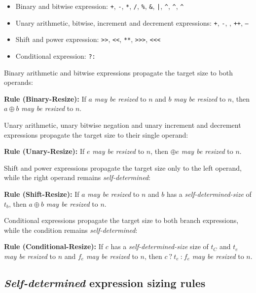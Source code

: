 \documentclass{article}
\newcommand{\tild}{\raisebox{-.7ex}{\textasciitilde{}}}
\newcommand{\sds}{\emph{self-determined-size}}
\newcommand{\mbr}{\emph{may be resized}}
\newenvironment{typingrule}[1]%
{\par\noindent\textbf{Rule (#1):} }%
{\par}
\begin{document}
\begin{itemize}
  \item Binary and bitwise expression:  \texttt{+}, \texttt{-}, \texttt{*},
    \texttt{/}, \texttt{\%}, \texttt{\&}, \texttt{|}, \texttt{\^{}},
    \texttt{\^{}\tild}, \texttt{\tild\^{}}
  \item Unary arithmetic, bitwise, increment and decrement expressions:
    \texttt{+}, \texttt{-}, \texttt{\tild}, \texttt{++}, \texttt{--}
  \item Shift and power expression: \texttt{>>}, \texttt{<}\texttt{<},
    \texttt{**}, \texttt{>>>}, \texttt{<}\texttt{<}\texttt{<}
  \item Conditional expression: \texttt{?:}

\end{itemize}

Binary arithmetic and bitwise expressions propagate the target size to both
operands:

\begin{typingrule}{Binary-Resize}
  If $a$ \mbr{} to $n$ and $b$ \mbr{} to $n$, then $a \oplus b$ \mbr{} to $n$.
\end{typingrule}

Unary arithmetic, unary bitwise negation and unary increment and decrement
expressions propagate the target size to their single operand:

\begin{typingrule}{Unary-Resize}
  If $e$ \mbr{} to $n$, then $\oplus e$ \mbr{} to $n$.
\end{typingrule}

Shift and power expressions propagate the target size only to the left operand,
while the right operand remains \emph{self-determined}:

\begin{typingrule}{Shift-Resize}
  If $a$ \mbr{} to $n$ and $b$ has a \sds{} of $t_{b}$, then
  $a \oplus b$ \mbr{} to $n$.
\end{typingrule}

Conditional expressions propagate the target size to both branch expressions,
while the condition remains \emph{self-determined}:

\begin{typingrule}{Conditional-Resize}
  If $c$ has a \sds{} size of $t_{C}$ and $t_{e}$ \mbr{} to $n$ and $f_{e}$
  \mbr{} to $n$, then $c~\texttt{?}~t_{e}~\texttt{:}~f_{e}$ \mbr{} to $n$.
\end{typingrule}

\subsection{\emph{Self-determined} expression sizing rules}%
\label{self-determined-expression-sizing-rules}
\end{document}
